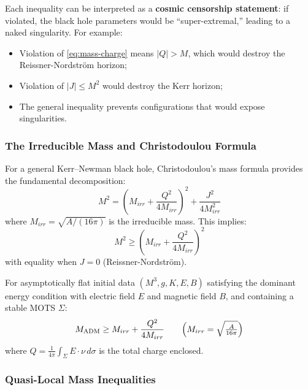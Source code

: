 \begin{remark}
Each inequality can be interpreted as a \textbf{cosmic censorship statement}: if violated, the black hole parameters would be ``super-extremal,'' leading to a naked singularity. For example:
\begin{itemize}
    \item Violation of \eqref{eq:mass-charge} means $|Q| > M$, which would destroy the Reissner-Nordstr\"om horizon;
    \item Violation of $|J| \leq M^2$ would destroy the Kerr horizon;
    \item The general inequality prevents configurations that would expose singularities.
\end{itemize}
\end{remark}

\subsubsection{The Irreducible Mass and Christodoulou Formula}

For a general Kerr--Newman black hole, Christodoulou's mass formula provides the fundamental decomposition:
\begin{equation}\label{eq:christodoulou}
M^2 = \left(M_{irr} + \frac{Q^2}{4M_{irr}}\right)^2 + \frac{J^2}{4M_{irr}^2}
\end{equation}
where $M_{irr} = \sqrt{A/(16\pi)}$ is the irreducible mass. This implies:
\begin{equation}\label{eq:christodoulou-bound}
M^2 \geq \left(M_{irr} + \frac{Q^2}{4M_{irr}}\right)^2
\end{equation}
with equality when $J = 0$ (Reissner-Nordstr\"om).

\begin{conjecture}
For asymptotically flat initial data $(M^3, g, K, E, B)$ satisfying the dominant energy condition with electric field $E$ and magnetic field $B$, and containing a stable MOTS $\Sigma$:
\begin{equation}
M_{\mathrm{ADM}} \geq M_{irr} + \frac{Q^2}{4M_{irr}} \qquad \Bigl(M_{irr}=\sqrt{\tfrac{A}{16\pi}}\Bigr)
\end{equation}
where $Q = \frac{1}{4\pi}\int_\Sigma E \cdot \nu \, d\sigma$ is the total charge enclosed.
\end{conjecture}

\subsubsection{Quasi-Local Mass Inequalities}

